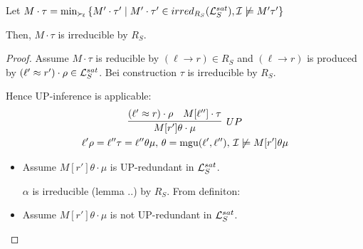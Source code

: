 \documentclass[%
handout,
]{beamer}
\begin{document}
\begin{frame}[allowframebreaks]


    \begin{lemma}
        Let $M\cdot\tau = \min_{\mathrel\succ_{\!\ell}}
         \left\{
             M'\cdot\tau' \mid
             M'\cdot\tau' \in irred_{R_S}(\mathcal{L}_S^{sat}),
             \mathcal{I} \not\models M'\tau'
         \right\}$

        Then, $M\cdot\tau$ is irreducible by $R_S$.
    \end{lemma}



    \begin{proof}
        Assume $M\cdot\tau$ is reducible by $(\ell\to r)\in R_S$
        and $(\ell\to r)$ is produced by $(\ell'\approx r')\cdot\rho\in\mathcal{L}_S^{sat}$.
        Bei construction $\tau$ is irreducible by $R_S$.

        Hence UP-inference is applicable:
        \begin{gather*}
            \infer[UP]
            {M[r']\theta\cdot\mu}
            {(\ell'\mEQ r)\cdot\rho & M[\ell'']\cdot\tau}
            \\
            \ell'\rho = \ell''\tau = \ell''\theta\mu,\,
            \theta=\mgu(\ell',\ell''),\,
            \mcI\not\models M[r']\theta\mu
        \end{gather*}

        \begin{itemize}
            \item Assume $M[r']\theta\cdot\mu$ is UP-redundant in $\mathcal{L}_S^{sat}$.

            $\alpha$ is irreducible (lemma ..) by $R_S$. From definiton:
            \item Assume $M[r']\theta\cdot\mu$ is not UP-redundant in $\mathcal{L}_S^{sat}$.
        \end{itemize}
    \end{proof}
\end{frame}
\end{document}
